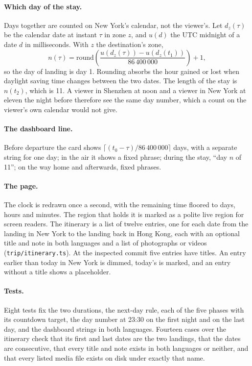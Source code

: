 \documentclass[sigconf,nonacm]{acmart}
\newcommand{\code}[1]{\textnormal{\texttt{\small #1}}}
\begin{document}
\paragraph{Which day of the stay.}
Days together are counted on New York's calendar, not the viewer's. Let $d_z(\tau)$ be the
calendar date at instant $\tau$ in zone $z$, and $u(d)$ the UTC midnight of a date $d$ in
milliseconds. With $z$ the destination's zone,
\begin{equation}\label{eq:tripday}
  n(\tau) = \mathrm{round}\!\left(\frac{u(d_z(\tau)) - u(d_z(t_1))}{86\,400\,000}\right) + 1 ,
\end{equation}
so the day of landing is day 1. Rounding absorbs the hour gained or lost when daylight saving
time changes between the two dates. The length of the stay is $n(t_2)$, which is 11. A viewer
in Shenzhen at noon and a viewer in New York at eleven the night before therefore see the same
day number, which a count on the viewer's own calendar would not give.

\paragraph{The dashboard line.}
Before departure the card shows $\lceil (t_0-\tau)/86\,400\,000 \rceil$ days, with a separate
string for one day; in the air it shows a fixed phrase; during the stay, ``day $n$ of 11''; on
the way home and afterwards, fixed phrases.

\paragraph{The page.}
The clock is redrawn once a second, with the remaining time floored to days, hours and
minutes. The region that holds it is marked as a polite live region for screen readers. The
itinerary is a list of twelve entries, one for each date from the landing in New York to the
landing back in Hong Kong, each with an optional title and note in both languages and a list
of photographs or videos (\code{trip/itinerary.ts}). At the inspected commit five entries have
titles. An entry earlier than today in New York is dimmed, today's is marked, and an entry
without a title shows a placeholder.

\paragraph{Tests.}
Eight tests fix the two durations, the next-day rule, each of the five phases with its
countdown target, the day number at 23:30 on the first night and on the last day, and the
dashboard strings in both languages. Fourteen cases over the itinerary check that its first
and last dates are the two landings, that the dates are consecutive, that every title and
note exists in both languages or neither, and that every listed media file exists on disk
under exactly that name.
\end{document}
